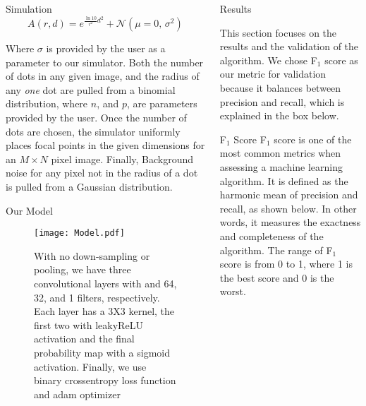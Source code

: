 \documentclass[final]{beamer}
\newlength{\onecolwid}
\begin{document}
\begin{frame}[t]
\begin{columns}[t]
\begin{column}{\onecolwid}
\begin{block}{Simulation}
\Large
\begin{equation}
    A(r,d) = e^{\frac{\ln{10}}{r^{2}}d^{2}} + \mathcal{N}(\mu = 0,\,\sigma^{2})
\end{equation}
\normalsize
\vspace{0.1in}

Where $\sigma$ is provided by the user as a parameter to our simulator.
Both the number of dots in any given image, and the radius of any \textit{one} dot are pulled from a binomial distribution, where $n$, and $p$, are parameters provided by the user. Once the number of dots are chosen, the simulator uniformly places focal points in the given dimensions for an $M \times N$ pixel image. Finally, Background noise for any pixel not in the radius of a dot is pulled from a Gaussian distribution.

\end{block}

\begin{block}{Our Model}


    \begin{figure}
        \texttt{[image: Model.pdf]}
        \setlength{\belowcaptionskip}{-20pt}
        \caption{
        With no down-sampling or pooling, we have three convolutional layers with and 64, 32, and 1 filters, respectively. Each layer has a 3X3 kernel, the first two with leakyReLU activation and the final probability map with a sigmoid activation. Finally, we use binary crossentropy loss function and adam optimizer}
    \end{figure}


\end{block}

\end{column}

\begin{column}{\onecolwid}
\begin{block}{Results}

This section focuses on the results and the validation of the algorithm. We chose F$_1$ score as our metric for validation because it balances between precision and recall, which is explained in the box below.
\vspace{.5in}
    \begin{alertblock}{F$_1$ Score}
    F$_1$ score is one of the most common metrics when assessing a machine learning algorithm. It is defined as the harmonic mean of precision and recall, as shown below. In other words, it measures the exactness and completeness of the algorithm. The range of F$_1$ score is from 0 to 1, where 1 is the best score and 0 is the worst.
  

\end{alertblock}
\end{block}
\end{column}
\end{columns}
\end{frame}
\end{document}
